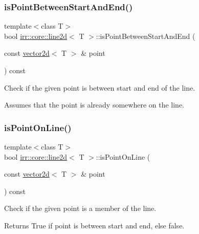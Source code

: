 \subsubsection{\texorpdfstring{is\+Point\+Between\+Start\+And\+End()}{isPointBetweenStartAndEnd()}\hspace{0.1cm}{\footnotesize\ttfamily [2/2]}}
{\footnotesize\ttfamily template$<$class T$>$ \\
bool \hyperlink{classirr_1_1core_1_1line2d}{irr\+::core\+::line2d}$<$ T $>$\+::is\+Point\+Between\+Start\+And\+End (\begin{DoxyParamCaption}\item[{const \hyperlink{classirr_1_1core_1_1vector2d}{vector2d}$<$ T $>$ \&}]{point }\end{DoxyParamCaption}) const\hspace{0.3cm}{\ttfamily [inline]}}



Check if the given point is between start and end of the line. 

Assumes that the point is already somewhere on the line. \mbox{\label{classirr_1_1core_1_1line2d_a00fcd43ae43b8b7e249b32206aaa22ff}} 
\subsubsection{\texorpdfstring{is\+Point\+On\+Line()}{isPointOnLine()}\hspace{0.1cm}{\footnotesize\ttfamily [1/2]}}
{\footnotesize\ttfamily template$<$class T$>$ \\
bool \hyperlink{classirr_1_1core_1_1line2d}{irr\+::core\+::line2d}$<$ T $>$\+::is\+Point\+On\+Line (\begin{DoxyParamCaption}\item[{const \hyperlink{classirr_1_1core_1_1vector2d}{vector2d}$<$ T $>$ \&}]{point }\end{DoxyParamCaption}) const\hspace{0.3cm}{\ttfamily [inline]}}



Check if the given point is a member of the line. 

\begin{DoxyReturn}{Returns}
True if point is between start and end, else false. 
\end{DoxyReturn}
\mbox{\label{classirr_1_1core_1_1line2d_a00fcd43ae43b8b7e249b32206aaa22ff}} 
